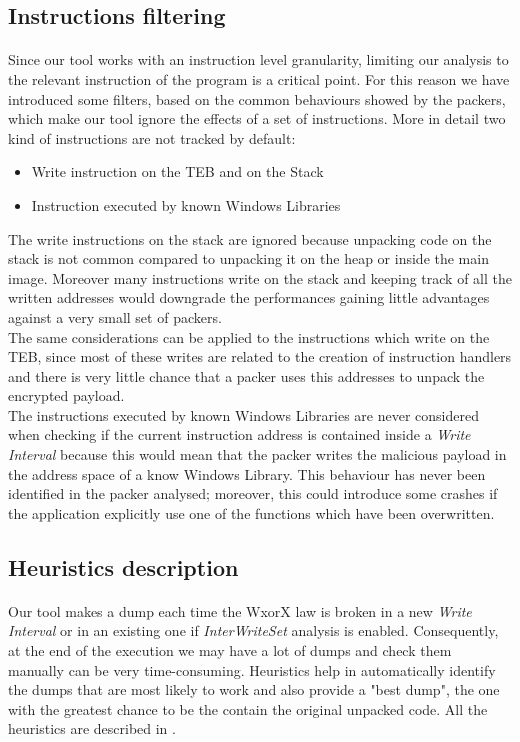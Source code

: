 \subsection{Instructions filtering}
\paragraph{}
Since our tool works with an instruction level granularity, limiting our analysis to the relevant instruction of the program is a critical point. For this reason we have introduced some filters, based on the common behaviours showed by the packers, which make our tool ignore the effects of a set of instructions. More in detail two kind of instructions are not tracked by default:
\begin{itemize}
	\item Write instruction on the TEB and on the Stack
	\item Instruction executed by known Windows Libraries
\end{itemize}
The write instructions on the stack are ignored because unpacking code on the stack is not common compared to unpacking it on the heap or inside the main image. Moreover many instructions write on the stack and keeping track of all the written addresses would downgrade the performances gaining little advantages against a very small set of packers.\\
The same considerations can be applied to the instructions which write on the TEB, since most of these writes are related to the creation of instruction handlers and there is very little chance that a packer uses this addresses to unpack the encrypted payload.\\
The instructions executed by known Windows Libraries are never considered when checking if the current instruction address is contained inside a \textit{Write Interval} because this would mean that the packer writes the malicious payload in the address space of a know Windows Library. This behaviour has never been identified in the packer analysed; moreover, this could introduce some crashes if the application explicitly use one of the functions which have been overwritten.

\subsection{Heuristics description}
\paragraph{}
Our tool makes a dump each time the WxorX law is broken in a new \textit{Write Interval} or in an existing one if \textit{InterWriteSet} analysis is enabled. Consequently, at the end of the execution we may have a lot of dumps and check them manually can be very time-consuming. Heuristics help in automatically identify the dumps that are most likely to work and also provide a "best dump", the one with the greatest chance to be the contain the original unpacked code. All the heuristics are described in \cite{Practical_Malware_Analysis}.
